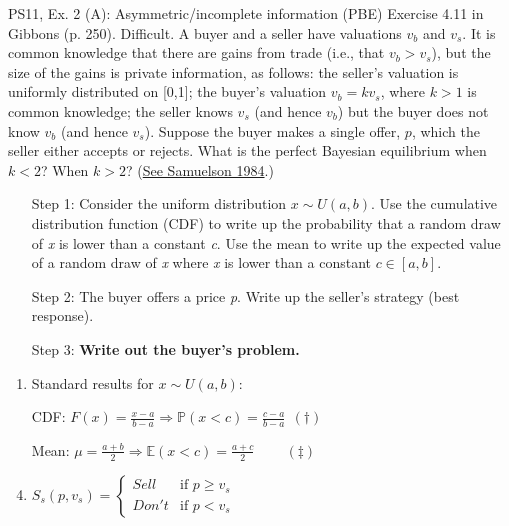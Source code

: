 \begin{frame}{PS11, Ex. 2 (A): Asymmetric/incomplete information (PBE)}
    Exercise 4.11 in Gibbons (p. 250). Difficult. A buyer and a seller have valuations $v_b$ and $v_s$. It is common knowledge that there are gains from trade (i.e., that $v_b > v_s$), but the size of the gains is private information, as follows: the seller’s valuation is uniformly distributed on [0,1]; the buyer’s valuation $v_b = kv_s$, where $k > 1$ is common knowledge; the seller knows $v_s$ (and hence $v_b$) but the buyer does not know $v_b$ (and hence $v_s$). Suppose the buyer makes a single offer, $p$, which the seller either accepts or rejects. What is the perfect Bayesian equilibrium when $k < 2$? When $k > 2$? (\href{https://www.jstor.org/stable/1911195}{See Samuelson 1984}.) \vspace{-8pt}
    \begin{multicols}{2}
      \begin{itemize}
        \item[Step 1:] Consider the uniform distribution $x\sim U(a, b)$. Use the cumulative distribution function (CDF) to write up the probability that a random draw of \textit{x} is lower than a constant \textit{c}. Use the mean to write up the expected value of a random draw of \textit{x} where \textit{x} is lower than a constant $c\in[a,b]$.
        \item[Step 2:] The buyer offers a price \textit{p}. Write up the seller's strategy (best response).
        \item[Step 3:] \textbf{Write out the buyer's problem.}
      \end{itemize}
      \vfill\null\columnbreak
      \begin{enumerate}
        \item Standard results for $x\sim U(a, b):$
        \item[CDF:] $F(x)=\frac{x-a}{b-a}\Rightarrow\mathbb{P}(x<c)=\frac{c-a}{b-a}\ \ (\dagger)$
        \item[Mean:] $\mu=\frac{a+b}{2}\Rightarrow\mathbb{E}(x<c)=\frac{a+c}{2}\quad\quad\ (\ddagger)$
        \item $S_s(p,v_s)=\left\{\begin{array}{ll}
          Sell  & \text{if }p\geq v_s \\
          Don't & \text{if }p < v_s
        \end{array}\right.$
      \end{enumerate}
      \vfill\null
    \end{multicols}
\end{frame}

